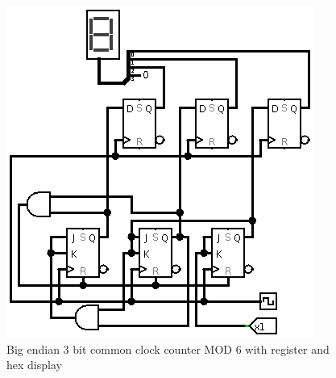 \documentclass[11pt]{scrartcl}
\begin{document}
\begin{figure}[h]
    \centering
    \includegraphics[scale=0.5]{images/bigendian3bitcommonclockcountermod6withregisterhexdisplay.png}
    \caption{Big endian 3 bit common clock counter MOD 6 with register and hex display}
\end{figure}
\end{document}
